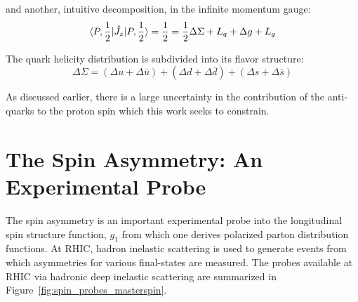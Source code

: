{\noindent}and another, intuitive decomposition, in the infinite momentum gauge:
\begin{equation}
  \braket{P,{1\over2}|\hat{J_z}|P,{1\over2}}  
  = {1\over2} = {{1\over2}\Delta \Sigma +L_q+\Delta g + L_g}
  \label{eq:infmom_ellis_jeffe_sum}
\end{equation}

{\noindent}The quark helicity distribution is subdivided into its flavor
structure:
\begin{equation}
  {\Delta \Sigma} =
  {
    (\Delta u+\Delta \bar{u})
    +(\Delta d + \Delta \bar{d})
    +(\Delta s + \Delta \bar{s})
  }
  \label{eq:quark_spin_decomposition}
\end{equation}

{\noindent}As discussed earlier, there is a large uncertainty in the
contribution of the anti-quarks to the proton spin which this work seeks to
constrain.

\section{The Spin Asymmetry: An Experimental Probe }

The spin asymmetry is an important experimental probe into the longitudinal spin
structure function, $g_1$ from which one derives polarized parton distribution
functions. At RHIC, hadron inelastic scattering is used to generate events from
which asymmetries for various final-states are measured. The probes available at
RHIC via hadronic deep inelastic scattering are summarized in
Figure~\ref{fig:spin_probes_masterspin}.

